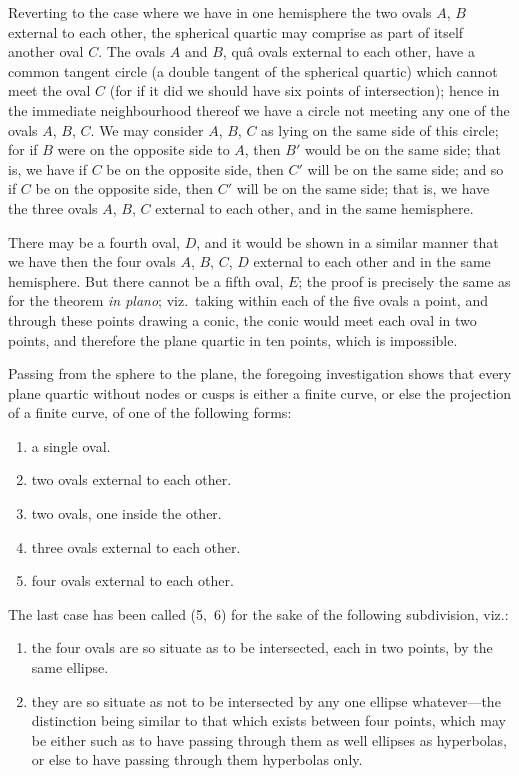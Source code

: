 \documentclass[11pt]{article}
\begin{document}
Reverting to the case where we have in one hemisphere the two ovals $A$, $B$ external to each other, the spherical quartic may comprise as part of itself another oval $C$. The ovals $A$ and $B$, qu\^a ovals external to each other, have a common tangent circle (a double tangent of the spherical quartic) which cannot meet the oval $C$ (for if it did we should have six points of intersection); hence in the immediate neighbourhood thereof we have a circle not meeting any one of the ovals $A$, $B$, $C$. We may consider $A$, $B$, $C$ as lying on the same side of this circle; for if $B$ were on the opposite side to $A$, then $B'$ would be on the same side; that is, we have if $C$ be on the opposite side, then $C'$ will be on the same side; and so if $C$ be on the opposite side, then $C'$ will be on the same side; that is, we have the three ovals $A$, $B$, $C$ external to each other, and in the same hemisphere.

There may be a fourth oval, $D$, and it would be shown in a similar manner that we have then the four ovals $A$, $B$, $C$, $D$ external to each other and in the same hemisphere. But there cannot be a fifth oval, $E$; the proof is precisely the same as for the theorem \textit{in plano}; viz.\ taking within each of the five ovals a point, and through these points drawing a conic, the conic would meet each oval in two points, and therefore the plane quartic in ten points, which is impossible.

Passing from the sphere to the plane, the foregoing investigation shows that every plane quartic without nodes or cusps is either a finite curve, or else the projection of a finite curve, of one of the following forms:
\begin{enumerate}
\item[1.] a single oval.
\item[2.] two ovals external to each other.
\item[3.] two ovals, one inside the other.
\item[4.] three ovals external to each other.
\item[5, 6.] four ovals external to each other.
\end{enumerate}
The last case has been called (5,~6) for the sake of the following subdivision, viz.:
\begin{enumerate}
\item[5.] the four ovals are so situate as to be intersected, each in two points, by the same ellipse.
\item[6.] they are so situate as not to be intersected by any one ellipse whatever---the distinction being similar to that which exists between four points, which may be either such as to have passing through them as well ellipses as hyperbolas, or else to have passing through them hyperbolas only.
\end{enumerate}
\end{document}

